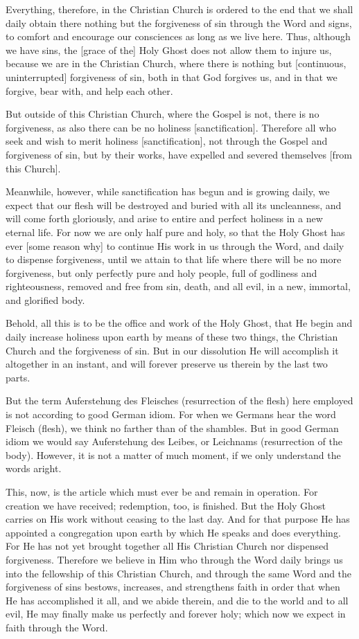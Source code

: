 Everything, therefore, in the Christian Church is ordered to the end
that we shall daily obtain there nothing but the forgiveness of sin
through the Word and signs, to comfort and encourage our consciences as
long as we live here. Thus, although we have sins, the [grace of the]
Holy Ghost does not allow them to injure us, because we are in the
Christian Church, where there is nothing but [continuous,
uninterrupted] forgiveness of sin, both in that God forgives us, and in
that we forgive, bear with, and help each other.

But outside of this Christian Church, where the Gospel is not, there is
no forgiveness, as also there can be no holiness [sanctification].
Therefore all who seek and wish to merit holiness [sanctification], not
through the Gospel and forgiveness of sin, but by their works, have
expelled and severed themselves [from this Church].

Meanwhile, however, while sanctification has begun and is growing
daily, we expect that our flesh will be destroyed and buried with all
its uncleanness, and will come forth gloriously, and arise to entire
and perfect holiness in a new eternal life. For now we are only half
pure and holy, so that the Holy Ghost has ever [some reason why] to
continue His work in us through the Word, and daily to dispense
forgiveness, until we attain to that life where there will be no more
forgiveness, but only perfectly pure and holy people, full of godliness
and righteousness, removed and free from sin, death, and all evil, in a
new, immortal, and glorified body.

Behold, all this is to be the office and work of the Holy Ghost, that
He begin and daily increase holiness upon earth by means of these two
things, the Christian Church and the forgiveness of sin. But in our
dissolution He will accomplish it altogether in an instant, and will
forever preserve us therein by the last two parts.

But the term Auferstehung des Fleisches (resurrection of the flesh)
here employed is not according to good German idiom. For when we
Germans hear the word Fleisch (flesh), we think no farther than of the
shambles. But in good German idiom we would say Auferstehung des
Leibes, or Leichnams (resurrection of the body). However, it is not a
matter of much moment, if we only understand the words aright.

This, now, is the article which must ever be and remain in operation.
For creation we have received; redemption, too, is finished. But the
Holy Ghost carries on His work without ceasing to the last day. And for
that purpose He has appointed a congregation upon earth by which He
speaks and does everything. For He has not yet brought together all His
Christian Church nor dispensed forgiveness. Therefore we believe in Him
who through the Word daily brings us into the fellowship of this
Christian Church, and through the same Word and the forgiveness of sins
bestows, increases, and strengthens faith in order that when He has
accomplished it all, and we abide therein, and die to the world and to
all evil, He may finally make us perfectly and forever holy; which now
we expect in faith through the Word.

